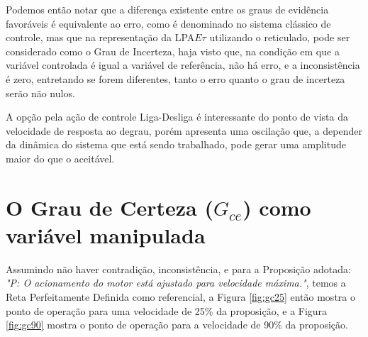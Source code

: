 




Podemos então notar que 
a diferença existente entre os graus de evidência favoráveis 
é equivalente ao erro, 
como é denominado no sistema clássico de controle, 
mas que na representação da LPA$E\tau$ utilizando o reticulado,
pode ser considerado como 
o Grau de Incerteza, haja visto que,
na condição em que a variável controlada é igual a 
variável de referência, não há erro, e a inconsistência é zero, 
entretando se forem diferentes, 
tanto o erro quanto o grau de incerteza
serão não nulos. 

A opção pela ação de controle Liga-Desliga
é interessante do ponto de vista da velocidade 
de resposta ao degrau, 
porém apresenta uma oscilação que, 
a depender da dinâmica do sistema que está sendo trabalhado,
pode gerar uma amplitude maior do que o aceitável.



\section{O Grau de Certeza ($G_{ce}$) como variável manipulada }

Assumindo não haver contradição, inconsistência, 
e para a Proposição adotada: 
\emph{"P: O acionamento do motor está ajustado para velocidade máxima."}, 
temos a Reta Perfeitamente Definida como referencial,
a Figura \ref{fig:gc25} então mostra o ponto de operação 
para uma velocidade de 25\% da proposição, 
e a Figura \ref{fig:gc90} mostra o ponto de operação
para a velocidade de 90\% da proposição.


